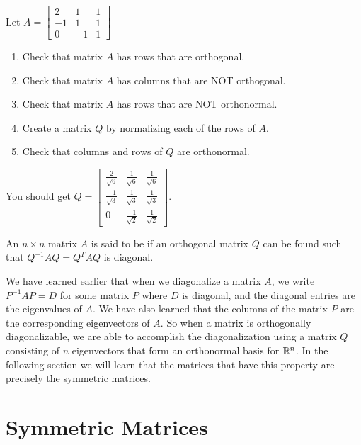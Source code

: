 \documentclass{ximera}
\begin{document}

\begin{exploration}\label{exp:make_orthogonal}
Let $A=\begin{bmatrix}
    2&1&1\\-1&1&1\\0&-1&1
\end{bmatrix}$
\begin{enumerate}
    \item Check that matrix $A$ has rows that are orthogonal.
    \item Check that matrix $A$ has columns that are NOT orthogonal.
    \item Check that matrix $A$ has rows that are NOT orthonormal.
    \item Create a matrix $Q$ by normalizing each of the rows of $A$.
    \item Check that columns and rows of $Q$ are orthonormal.
\end{enumerate}


You should get $Q = \begin{bmatrix}
\frac{2}{\sqrt{6}} & \frac{1}{\sqrt{6}} & \frac{1}{\sqrt{6}} \\
\frac{-1}{\sqrt{3}} & \frac{1}{\sqrt{3}} & \frac{1}{\sqrt{3}} \\
0 & \frac{-1}{\sqrt{2}} & \frac{1}{\sqrt{2}}
\end{bmatrix}$.

\end{exploration}

\begin{definition}\label{def:orthDiag}
An $n \times n$ matrix $A$ is said to be  if an orthogonal matrix $Q$ can be found such that  $Q^{-1}AQ = Q^{T}AQ$ is diagonal.
\end{definition}

We have learned earlier that when we diagonalize a matrix $A$, we write $P^{-1}AP=D$ for some matrix $P$ where $D$ is diagonal, and the diagonal entries are the eigenvalues of $A$.  We have also learned that the columns of the matrix $P$ are the corresponding eigenvectors of $A$.  So when a matrix is orthogonally diagonalizable, we are able to accomplish the diagonalization using a matrix $Q$ consisting of $n$ eigenvectors that form an orthonormal basis for $\mathbb{R}^n$.  In the following section we will learn that the matrices that have this property are precisely the symmetric matrices.

\section*{Symmetric Matrices}
\end{document}
